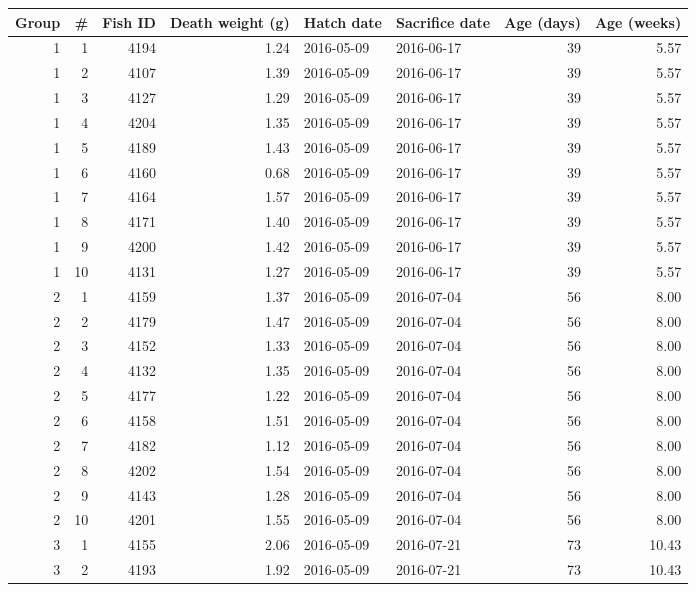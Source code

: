 \begin{tabular}{rrrrllrr}
  \toprule Group & \# & Fish ID\tnote{1} & Death weight (g) & Hatch date & Sacrifice date & Age (days) & Age (weeks) \\ 
  \midrule 1 & 1 & 4194 & 1.24 & 2016-05-09 & 2016-06-17 &  39 &  5.57 \\ 
  1 & 2 & 4107 & 1.39 & 2016-05-09 & 2016-06-17 &  39 &  5.57 \\ 
  1 & 3 & 4127 & 1.29 & 2016-05-09 & 2016-06-17 &  39 &  5.57 \\ 
  1 & 4 & 4204 & 1.35 & 2016-05-09 & 2016-06-17 &  39 &  5.57 \\ 
  1 & 5 & 4189 & 1.43 & 2016-05-09 & 2016-06-17 &  39 &  5.57 \\ 
  1 & 6 & 4160 & 0.68 & 2016-05-09 & 2016-06-17 &  39 &  5.57 \\ 
  1 & 7 & 4164 & 1.57 & 2016-05-09 & 2016-06-17 &  39 &  5.57 \\ 
  1 & 8 & 4171 & 1.40 & 2016-05-09 & 2016-06-17 &  39 &  5.57 \\ 
  1 & 9 & 4200 & 1.42 & 2016-05-09 & 2016-06-17 &  39 &  5.57 \\ 
  1 & 10 & 4131 & 1.27 & 2016-05-09 & 2016-06-17 &  39 &  5.57 \\\midrule
  2 & 1 & 4159 & 1.37 & 2016-05-09 & 2016-07-04 &  56 &  8.00 \\ 
  2 & 2 & 4179 & 1.47 & 2016-05-09 & 2016-07-04 &  56 &  8.00 \\ 
  2 & 3 & 4152 & 1.33 & 2016-05-09 & 2016-07-04 &  56 &  8.00 \\ 
  2 & 4 & 4132 & 1.35 & 2016-05-09 & 2016-07-04 &  56 &  8.00 \\ 
  2 & 5 & 4177 & 1.22 & 2016-05-09 & 2016-07-04 &  56 &  8.00 \\ 
  2 & 6 & 4158 & 1.51 & 2016-05-09 & 2016-07-04 &  56 &  8.00 \\ 
  2 & 7 & 4182 & 1.12 & 2016-05-09 & 2016-07-04 &  56 &  8.00 \\ 
  2 & 8 & 4202 & 1.54 & 2016-05-09 & 2016-07-04 &  56 &  8.00 \\ 
  2 & 9 & 4143 & 1.28 & 2016-05-09 & 2016-07-04 &  56 &  8.00 \\ 
  2 & 10 & 4201 & 1.55 & 2016-05-09 & 2016-07-04 &  56 &  8.00 \\\midrule
  3 & 1 & 4155 & 2.06 & 2016-05-09 & 2016-07-21 &  73 & 10.43 \\ 
  3 & 2 & 4193 & 1.92 & 2016-05-09 & 2016-07-21 &  73 & 10.43 \\ 

\end{tabular}

